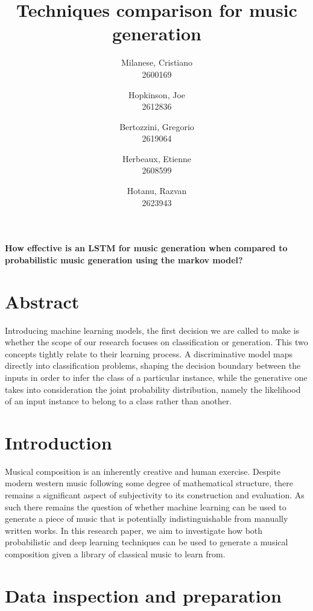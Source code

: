 \documentclass[12pt]{article}
\title{\Huge \textbf{Techniques comparison for music generation}}
\author{
      \small Milanese, Cristiano \\ \small 2600169
      \and
      \small Hopkinson, Joe \\ \small 2612836
      \and
      \small Bertozzini, Gregorio \\ \small 2619064
      \and
      \small Herbeaux, Etienne \\ \small 2608599
      \and
      \small Hotanu, Razvan \\ \small 2623943
}
\date{}
\begin{document}
\maketitle
\begin{center}
\textbf{How effective is an LSTM for music generation when compared to \\ probabilistic music generation using the markov model?}
\end{center}
\vspace{10pt}
\section*{Abstract}
  Introducing machine learning models, the first decision we are called to make is whether the scope of our research focuses on classification or generation. This two concepts tightly relate to their learning process. A discriminative model maps directly into classification problems, shaping the decision boundary between the inputs in order to infer the class of a particular instance, while the generative one takes into consideration the joint probability distribution, namely the likelihood of an input instance to belong to a class rather than another.
\section*{Introduction}
   Musical composition is an inherently creative and human exercise. Despite modern western music following some degree of mathematical structure, there remains a significant aspect of subjectivity to its construction and evaluation. As such there remains the question of whether machine learning can be used to generate a piece of music that is potentially indistinguishable from manually written works. In this research paper, we aim to investigate how both probabilistic and deep learning techniques can be used to generate a musical composition given a library of classical music to learn from.
\section*{Data inspection and preparation}
\end{document}
